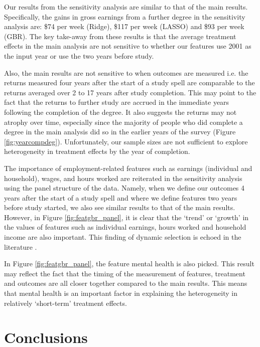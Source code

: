 \documentclass[12pt, a4paper]{article}
\begin{document}
Our results from the sensitivity analysis are similar to that of the main results. Specifically, the gains in gross earnings from a further degree in the sensitivity analysis are: \$74 per week (Ridge), \$117 per week (LASSO) and \$93 per week (GBR). The key take-away from these results is that the average treatment effects in the main analysis are not sensitive to whether our features use 2001 as the input year or use the two years before study. 

Also, the main results are not sensitive to when outcomes are measured i.e. the returns measured four years after the start of a study spell are comparable to the returns averaged over 2 to 17 years after study completion. This may point to the fact that the returns to further study are accrued in the immediate years following the completion of the degree. It also suggests the returns may not atrophy over time, especially since the majority of people who did complete a degree in the main analysis did so in the earlier years of the survey (Figure \ref{fig:yearcompdeg}). Unfortunately, our sample sizes are not sufficient to explore heterogeneity in treatment effects by the year of completion. 

The importance of employment-related features such as earnings (individual and household), wages, and hours worked are reiterated in the sensitivity analysis using the panel structure of the data. Namely, when we define our outcomes 4 years after the start of a study spell and where we define features two years before study started, we also see similar results to that of the main results. However, in Figure \ref{fig:featgbr_panel}, it is clear that the `trend' or `growth' in the values of features such as individual earnings, hours worked and household income are also important. This finding of dynamic selection is echoed in the literature \citep{jacobson2005, dynarski2016, dynarski2018}. 

In Figure \ref{fig:featgbr_panel}, the feature mental health is also picked. This result may reflect the fact that the timing of the measurement of features, treatment and outcomes are all closer together compared to the main results. This means that mental health is an important factor in explaining the heterogeneity in relatively `short-term' treatment effects. 


\section{Conclusions}
\end{document}

